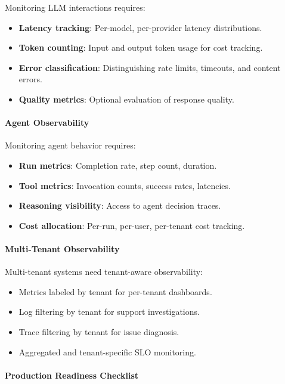 \documentclass[a4paper,twoside]{sapthesis}
\begin{document}
Monitoring LLM interactions requires:
\begin{itemize}
    \item \textbf{Latency tracking}: Per-model, per-provider latency distributions.
    \item \textbf{Token counting}: Input and output token usage for cost tracking.
    \item \textbf{Error classification}: Distinguishing rate limits, timeouts, and content errors.
    \item \textbf{Quality metrics}: Optional evaluation of response quality.
\end{itemize}

\paragraph{Agent Observability}

Monitoring agent behavior requires:
\begin{itemize}
    \item \textbf{Run metrics}: Completion rate, step count, duration.
    \item \textbf{Tool metrics}: Invocation counts, success rates, latencies.
    \item \textbf{Reasoning visibility}: Access to agent decision traces.
    \item \textbf{Cost allocation}: Per-run, per-user, per-tenant cost tracking.
\end{itemize}

\paragraph{Multi-Tenant Observability}

Multi-tenant systems need tenant-aware observability:
\begin{itemize}
    \item Metrics labeled by tenant for per-tenant dashboards.
    \item Log filtering by tenant for support investigations.
    \item Trace filtering by tenant for issue diagnosis.
    \item Aggregated and tenant-specific SLO monitoring.
\end{itemize}

\paragraph{Production Readiness Checklist}
\end{document}
